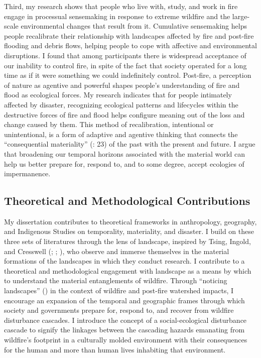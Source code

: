 \documentclass[
]{article}
\begin{document}
Third, my research shows that people who live with, study, and work in fire engage in processual sensemaking in response to extreme wildfire and the large-scale environmental changes that result from it. Cumulative sensemaking helps people recalibrate their relationship with landscapes affected by fire and post-fire flooding and debris flows, helping people to cope with affective and environmental disruptions. I found that among participants there is widespread acceptance of our inability to control fire, in spite of the fact that society operated for a long time as if it were something we could indefinitely control. Post-fire, a perception of nature as agentive and powerful shapes people's understanding of fire and flood as ecological forces. My research indicates that for people intimately affected by disaster, recognizing ecological patterns and lifecycles within the destructive forces of fire and flood helps configure meaning out of the loss and change caused by them. This method of recalibration, intentional or unintentional, is a form of adaptive and agentive thinking that connects the ``consequential materiality'' (: 23) of the past with the present and future. I argue that broadening our temporal horizons associated with the material world can help us better prepare for, respond to, and to some degree, accept ecologies of impermanence.

\subsection{Theoretical and Methodological Contributions}\label{theoretical-and-methodological-contributions}

My dissertation contributes to theoretical frameworks in anthropology, geography, and Indigenous Studies on temporality, materiality, and disaster. I build on these three sets of literatures through the lens of landscape, inspired by Tsing, Ingold, and Cresswell (; ; ), who observe and immerse themselves in the material formations of the landscapes in which they conduct research. I contribute to a theoretical and methodological engagement with landscape as a means by which to understand the material entanglements of wildfire. Through ``noticing landscapes'' () in the context of wildfire and post-fire watershed impacts, I encourage an expansion of the temporal and geographic frames through which society and governments prepare for, respond to, and recover from wildfire disturbance cascades. I introduce the concept of a social-ecological disturbance cascade to signify the linkages between the cascading hazards emanating from wildfire's footprint in a culturally molded environment with their consequences for the human and more than human lives inhabiting that environment.
\end{document}
